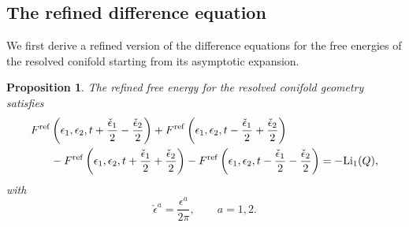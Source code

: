 \documentclass[pdftex]{sigma}
\numberwithin{equation}{section}
\newtheorem{Proposition}[Theorem]{Proposition}
 { \theoremstyle{definition}
\newtheorem{Definition}[Theorem]{Definition}
\newtheorem{Note}[Theorem]{Note}
\newtheorem{Example}[Theorem]{Example}
\newtheorem{Remark}[Theorem]{Remark} }
\begin{document}
\subsection{The refined difference equation}
We first derive a refined version of the difference equations for the free energies of the resolved conifold starting from its asymptotic expansion.

\begin{Proposition} The refined free energy for the resolved conifold geometry satisfies
\begin{align}
F^{{\rm ref}}&\left(\epsilon_1,\epsilon_2,t+\frac{\check{\epsilon}_1}{2}-\frac{\check{\epsilon}_2}{2}\right) + F^{{\rm ref}}\left(\epsilon_1,\epsilon_2,t-\frac{\check{\epsilon}_1}{2}+\frac{\check{\epsilon}_2}{2} \right) \nonumber\\
&-F^{{\rm ref}}\left(\epsilon_1,\epsilon_2,t+\frac{\check{\epsilon}_1}{2}+\frac{\check{\epsilon}_2}{2}\right)-F^{{\rm ref}}\left(\epsilon_1,\epsilon_2,t-\frac{\check{\epsilon}_1}{2}-\frac{\check{\epsilon}_2}{2} \right)=-{\rm Li}_1(Q),\label{eq:refdiffeq}
\end{align}
with
\begin{equation*}
\check{\epsilon}^a=\frac{\epsilon^a}{2\pi}, \qquad a=1,2.
\end{equation*}
\end{Proposition}
\end{document}
